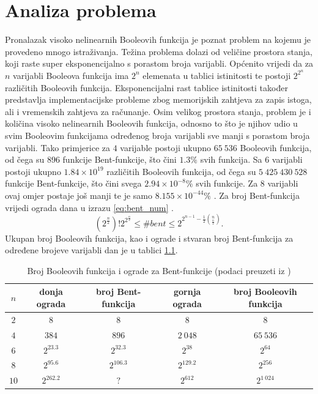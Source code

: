\chapter{Analiza problema}
Pronalazak visoko nelinearnih Booleovih funkcija je poznat problem na kojemu je provedeno mnogo istraživanja.
Težina problema dolazi od veličine prostora stanja, koji raste super eksponencijalno s porastom broja varijabli.
Općenito vrijedi da za $n$ varijabli Booleova funkcija ima $2^n$ elemenata u tablici istinitosti te postoji $2^{2^n}$ različitih Booleovih funkcija.
Eksponencijalni rast tablice istinitosti također predstavlja implementacijske probleme zbog memorijskih zahtjeva za zapis istoga, ali i vremenskih zahtjeva za računanje.
Osim velikog prostora stanja, problem je i količina visoko nelinearnih Booleovih funkcija, odnosno to što je njihov udio u svim Booleovim funkcijama određenog broja varijabli sve manji s porastom broja varijabli.
Tako primjerice za $4$ varijable postoji ukupno $65\:536$ Booleovih funkcija, od čega su $896$ funkcije Bent-funkcije, što čini $1.3\%$ svih funkcija.
Sa $6$ varijabli postoji ukupno $1.84 \times 10^{19}$ različitih Booleovih funkcija, od čega su $5\:425\:430\:528$ funkcije Bent-funkcije, što čini svega $2.94 \times 10^{-8}\%$ svih funkcije.
Za $8$ varijabli ovaj omjer postaje još manji te je samo $8.155 \times 10^{-44}\%$ \cite{DiscoveryOfBent}.
Za broj Bent-funkcija vrijedi ograda dana u izrazu \eqref{eq:bent_num} \cite{CryptographicBooleanFunctions}.
\begin{equation}\label{eq:bent_num}
    \left(2^{\frac{n}{2}}\right)! 2^{2^{\frac{n}{2}}} \leq
    \#bent \leq
    2^{2^{n-1}-\frac{1}{2}\binom{n}{\frac{n}{2}}}.
\end{equation}
Ukupan broj Booleovih funkcija, kao i ograde i stvaran broj Bent-funkcija za određene brojeve varijabli dan je u tablici \ref{tbl:boolean_count}.
\begin{table}[]
\caption{Broj Booleovih funkcija i ograde za Bent-funkcije (podaci preuzeti iz \cite{CryptographicBooleanFunctions})}
\begin{tabular}{c|cccc}
$n$ & donja ograda & broj Bent-funkcija & gornja ograda & broj Booleovih funkcija \\ \hline
$2$ & $8$ & $8$ & $8$ & $8$ \\
$4$ & $384$ & $896$ & $2\:048$ & $65\:536$ \\
$6$ & $2^{23.3}$ & $2^{32.3}$ & $2^{38}$ & $2^{64}$ \\
$8$ & $2^{95.6}$ & $2^{106.3}$ & $2^{129.2}$ & $2^{256}$ \\
$10$ & $2^{262.2}$ & $?$ & $2^{612}$ & $2^{1\:024}$
\end{tabular}
\label{tbl:boolean_count}
\end{table}

